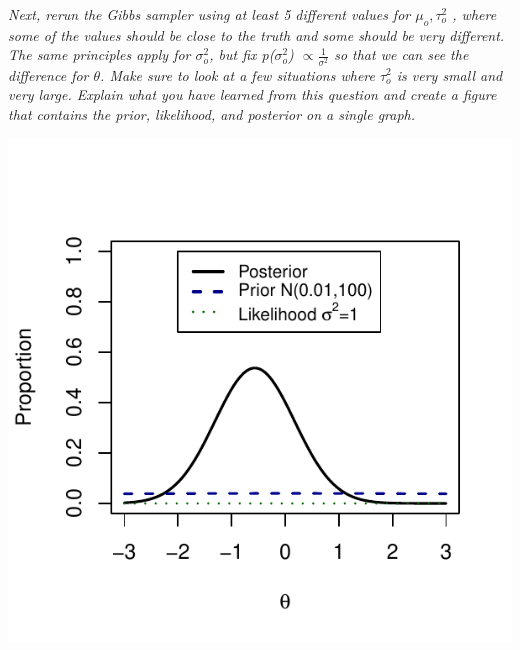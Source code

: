 \documentclass{article}\usepackage[]{graphicx}\usepackage[]{color}
\makeatletter
\def\maxwidth{ %
  \ifdim\Gin@nat@width>\linewidth
    \linewidth
  \else
    \Gin@nat@width
  \fi
}
\newenvironment{knitrout}{}{} %
\makeatother
\begin{document}
\begin{enumerate}
\begin{knitrout}
{}



\end{knitrout}

{\it Next, rerun the Gibbs sampler using at least 5 different values for $\mu_{o}, \tau_{o}^2$ , where some of the values should be close to the truth and some should be very different. The same principles apply for $\sigma^2_{o}$, but fix p($\sigma^2_{o}$) $\propto \frac{1}{\sigma^2}$ so that we can see the difference for $\theta$. Make sure to look at a few situations where $\tau_{o}^2$ is very small and very large. Explain what you have learned from this question and create a figure that contains the prior, likelihood, and posterior on a single graph.}

\begin{knitrout}
\color{fgcolor}

{\centering \includegraphics[width=\maxwidth]{figure/prob1x-1} 

}



\end{knitrout}



\end{enumerate}
\end{document}
